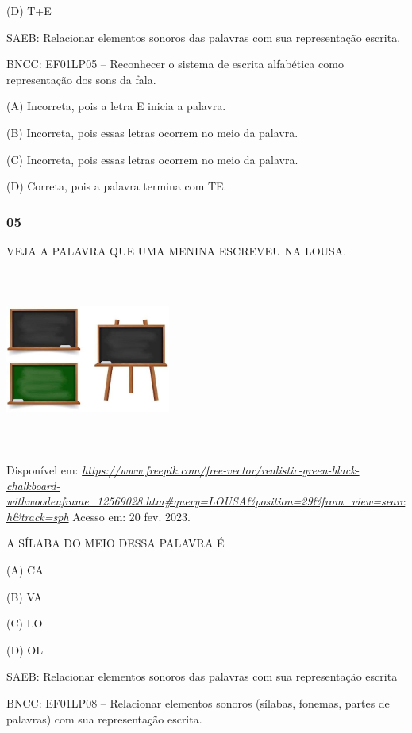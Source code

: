 (D) T+E

SAEB: Relacionar elementos sonoros das palavras com sua
representação escrita.

BNCC: EF01LP05 -- Reconhecer o sistema de escrita alfabética
como representação dos sons da fala.

(A) Incorreta, pois a letra E inicia a palavra.

(B) Incorreta, pois essas letras ocorrem no meio da palavra.

(C) Incorreta, pois essas letras ocorrem no meio da palavra.

(D) Correta, pois a palavra termina com TE.

\subsubsection{05}\label{section-61}

VEJA A PALAVRA QUE UMA MENINA ESCREVEU NA LOUSA.

\includegraphics[width=2.13044in,height=2.33234in]{media/image231.jpg}

Disponível em: 
\href{https://www.freepik.com/free-vector/realistic-green-black-chalkboard-withwoodenframe_12569028.htm\#query=LOUSA\&position=29\&from_view=search\&track=sph}{\emph{https://www.freepik.com/free-vector/realistic-green-black-chalkboard-withwoodenframe\_12569028.htm\#query=LOUSA\&position=29\&from\_view=search\&track=sph}}
Acesso em: 20 fev. 2023.

A SÍLABA DO MEIO DESSA PALAVRA É

(A) CA

(B) VA

(C) LO

(D) OL

SAEB: Relacionar elementos sonoros das palavras com sua representação escrita

BNCC: EF01LP08 -- Relacionar elementos sonoros (sílabas, fonemas, partes de
palavras) com sua representação escrita.

